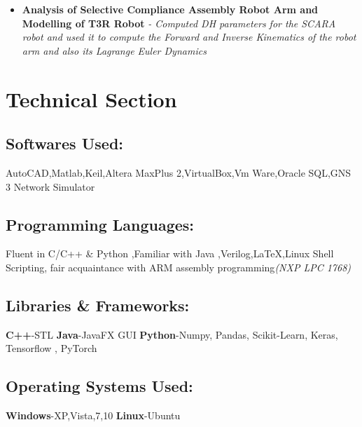 \documentclass{article}
\begin{document}
\begin{itemize}
    \item{\textbf{\large{Analysis of Selective Compliance Assembly Robot Arm and Modelling of T3R Robot}}}
          \newline
          \textit{- Computed DH parameters for the SCARA robot and used it to compute the Forward and Inverse Kinematics of the robot arm and also its Lagrange Euler Dynamics}
\end{itemize}




\section*{Technical Section}
\subsection*{Softwares Used:}
AutoCAD,Matlab,Keil,Altera MaxPlus 2,VirtualBox,Vm Ware,Oracle SQL,GNS 3 Network Simulator
\subsection*{Programming Languages:}
Fluent in C/C++ \& Python ,Familiar with Java ,Verilog,{\LaTeX},Linux Shell Scripting,
fair acquaintance with ARM assembly programming\textit{(NXP LPC 1768)}
\subsection*{Libraries \& Frameworks:}
\textbf{C++}-STL
\textbf{Java}-JavaFX GUI
\textbf{Python}-Numpy, Pandas, Scikit-Learn, Keras, Tensorflow , PyTorch
\subsection*{Operating Systems Used:}
\textbf{Windows}-XP,Vista,7,10
\textbf{Linux}-Ubuntu
\end{document}
